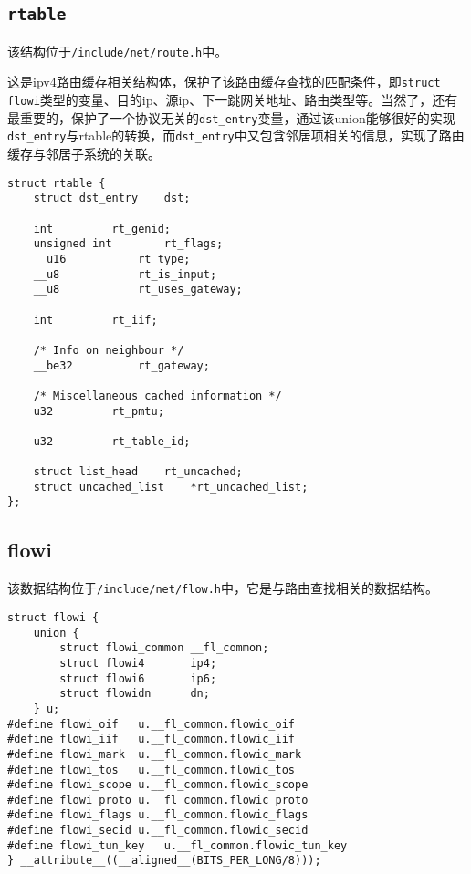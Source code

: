 		\subsection{\texttt{rtable}}

			该结构位于\texttt{/include/net/route.h}中。

			这是ipv4路由缓存相关结构体，保护了该路由缓存查找的匹配条件，即\texttt{struct flowi}类型的变量、目的ip、源ip、下一跳网关地址、路由类型等。当然了，还有最重要的，保护了一个协议无关的\texttt{dst_entry}变量，通过该union能够很好的实现\texttt{dst_entry}与rtable的转换，而\texttt{dst_entry}中又包含邻居项相关的信息，实现了路由缓存与邻居子系统的关联。

\begin{verbatim}
struct rtable {
	struct dst_entry	dst;

	int			rt_genid;
	unsigned int		rt_flags;
	__u16			rt_type;
	__u8			rt_is_input;
	__u8			rt_uses_gateway;

	int			rt_iif;

	/* Info on neighbour */
	__be32			rt_gateway;

	/* Miscellaneous cached information */
	u32			rt_pmtu;

	u32			rt_table_id;

	struct list_head	rt_uncached;
	struct uncached_list	*rt_uncached_list;
};
\end{verbatim}

		\subsection{flowi}

			该数据结构位于\texttt{/include/net/flow.h}中，它是与路由查找相关的数据结构。
\begin{verbatim}
struct flowi {
	union {
		struct flowi_common	__fl_common;
		struct flowi4		ip4;
		struct flowi6		ip6;
		struct flowidn		dn;
	} u;
#define flowi_oif	u.__fl_common.flowic_oif
#define flowi_iif	u.__fl_common.flowic_iif
#define flowi_mark	u.__fl_common.flowic_mark
#define flowi_tos	u.__fl_common.flowic_tos
#define flowi_scope	u.__fl_common.flowic_scope
#define flowi_proto	u.__fl_common.flowic_proto
#define flowi_flags	u.__fl_common.flowic_flags
#define flowi_secid	u.__fl_common.flowic_secid
#define flowi_tun_key	u.__fl_common.flowic_tun_key
} __attribute__((__aligned__(BITS_PER_LONG/8)));
\end{verbatim}
